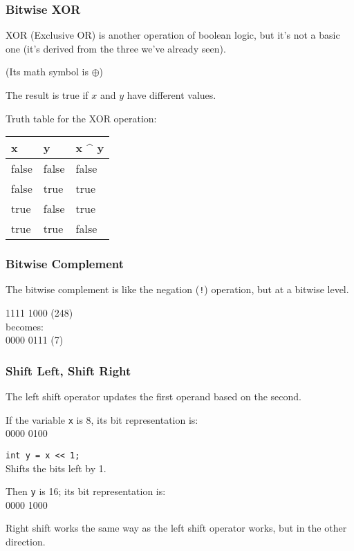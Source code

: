 \begin{frame}
\frametitle{Bitwise XOR}
XOR (Exclusive OR) is another operation of boolean logic, but it's not a basic one (it's derived from the three we've already seen).

(Its math symbol is $\oplus$)

The result is true if $x$ and $y$ have different values.

Truth table for the XOR operation:

\begin{center}
\begin{tabular}{l|l|l}
	\textbf{x} & \textbf{y} & \textbf{x \^{} y}\\ \hline
	false & false & false \\ \hline
	false & true & true \\ \hline
	true & false & true \\ \hline
	true & true & false \\ 
\end{tabular}
\end{center}

\end{frame}

\begin{frame}
\frametitle{Bitwise Complement}

The bitwise complement is like the negation (\texttt{!}) operation, but at a bitwise level.

1111 1000 (248)\\
becomes:\\
0000 0111 (7)\\

\end{frame}

\begin{frame}
\frametitle{Shift Left, Shift Right}
The left shift operator updates the first operand based on the second.

If the variable \texttt{x} is 8, its bit representation is:\\
0000 0100

\texttt{int y = x << 1;}\\
Shifts the bits left by 1.

Then \texttt{y} is 16; its bit representation is:\\
0000 1000

Right shift works the same way as the left shift operator works, but in the other direction.

\end{frame}

